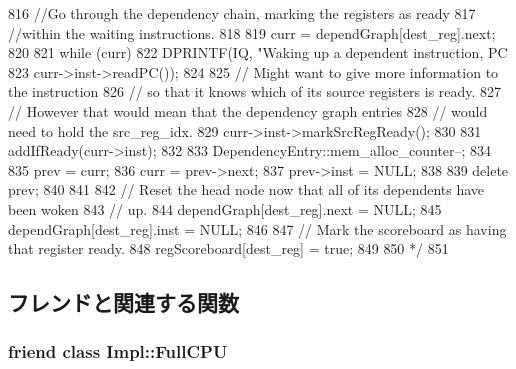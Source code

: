 \begin{DoxyCode}
{{816         //Go through the dependency chain, marking the registers as ready
817         //within the waiting instructions.
818 
819         curr = dependGraph[dest_reg].next;
820 
821         while (curr) {
822             DPRINTF(IQ, "Waking up a dependent instruction, PC%
823                     curr->inst->readPC());
824 
825             // Might want to give more information to the instruction
826             // so that it knows which of its source registers is ready.
827             // However that would mean that the dependency graph entries
828             // would need to hold the src_reg_idx.
829             curr->inst->markSrcRegReady();
830 
831             addIfReady(curr->inst);
832 
833             DependencyEntry::mem_alloc_counter--;
834 
835             prev = curr;
836             curr = prev->next;
837             prev->inst = NULL;
838 
839             delete prev;
840         }
841 
842         // Reset the head node now that all of its dependents have been woken
843         // up.
844         dependGraph[dest_reg].next = NULL;
845         dependGraph[dest_reg].inst = NULL;
846 
847         // Mark the scoreboard as having that register ready.
848         regScoreboard[dest_reg] = true;
849     }
850 */
851 }
\end{DoxyCode}


\subsection{フレンドと関連する関数}
\hypertarget{classInstQueue_a0b1390899d1d55620476dd762bd7ac6c}{
\subsubsection[{Impl::FullCPU}]{\setlength{\rightskip}{0pt plus 5cm}friend class Impl::FullCPU}}
\label{classInstQueue_a0b1390899d1d55620476dd762bd7ac6c}


